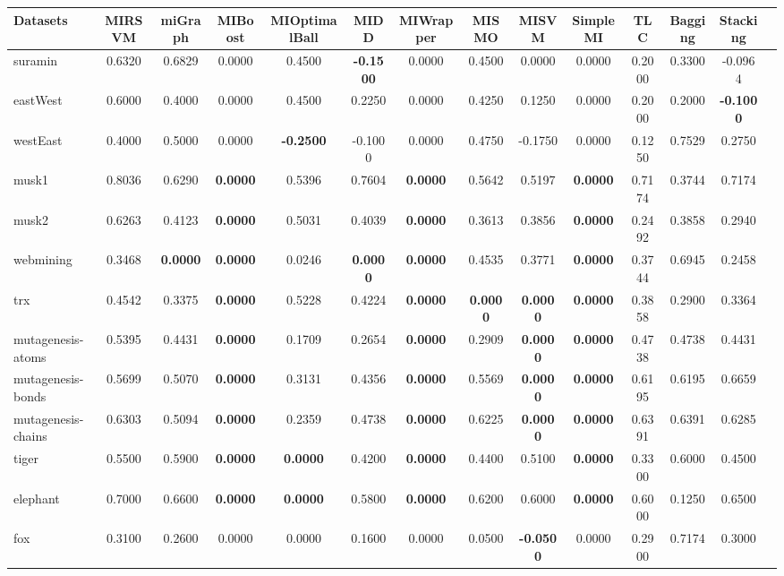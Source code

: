\begin{threeparttable}
\begin{tabular}{lccccccccccccc}
\toprule
Datasets &MIRSVM &miGraph &MIBoost &MIOptimalBall &MIDD &MIWrapper &MISMO &MISVM &SimpleMI &TLC &Bagging &Stacking \\
\midrule
suramin &0.6320 &0.6829 &0.0000 &0.4500 &\textbf{-0.1500} &0.0000 &0.4500 &0.0000 &0.0000 &0.2000 &0.3300 &-0.0964 &  \\
eastWest &0.6000 &0.4000 &0.0000 &0.4500 &0.2250 &0.0000 &0.4250 &0.1250 &0.0000 &0.2000 &0.2000 &\textbf{-0.1000} &  \\
westEast &0.4000 &0.5000 &0.0000 &\textbf{-0.2500} &-0.1000 &0.0000 &0.4750 &-0.1750 &0.0000 &0.1250 &0.7529 &0.2750 &  \\
musk1 &0.8036 &0.6290 &\textbf{0.0000} &0.5396 &0.7604 &\textbf{0.0000} &0.5642 &0.5197 &\textbf{0.0000} &0.7174 &0.3744 &0.7174 &  \\
musk2 &0.6263 &0.4123 &\textbf{0.0000} &0.5031 &0.4039 &\textbf{0.0000} &0.3613 &0.3856 &\textbf{0.0000} &0.2492 &0.3858 &0.2940 &  \\
webmining &0.3468 &\textbf{0.0000} &\textbf{0.0000} &0.0246 &\textbf{0.0000} &\textbf{0.0000} &0.4535 &0.3771 &\textbf{0.0000} &0.3744 &0.6945 &0.2458 &  \\
trx &0.4542 &0.3375 &\textbf{0.0000} &0.5228 &0.4224 &\textbf{0.0000} &\textbf{0.0000} &\textbf{0.0000} &\textbf{0.0000} &0.3858 &0.2900 &0.3364 &  \\
mutagenesis-atoms &0.5395 &0.4431 &\textbf{0.0000} &0.1709 &0.2654 &\textbf{0.0000} &0.2909 &\textbf{0.0000} &\textbf{0.0000} &0.4738 &0.4738 &0.4431 &  \\
mutagenesis-bonds &0.5699 &0.5070 &\textbf{0.0000} &0.3131 &0.4356 &\textbf{0.0000} &0.5569 &\textbf{0.0000} &\textbf{0.0000} &0.6195 &0.6195 &0.6659 &  \\
mutagenesis-chains &0.6303 &0.5094 &\textbf{0.0000} &0.2359 &0.4738 &\textbf{0.0000} &0.6225 &\textbf{0.0000} &\textbf{0.0000} &0.6391 &0.6391 &0.6285 &  \\
tiger &0.5500 &0.5900 &\textbf{0.0000} &\textbf{0.0000} &0.4200 &\textbf{0.0000} &0.4400 &0.5100 &\textbf{0.0000} &0.3300 &0.6000 &0.4500 &  \\
elephant &0.7000 &0.6600 &\textbf{0.0000} &\textbf{0.0000} &0.5800 &\textbf{0.0000} &0.6200 &0.6000 &\textbf{0.0000} &0.6000 &0.1250 &0.6500 &  \\
fox &0.3100 &0.2600 &0.0000 &0.0000 &0.1600 &0.0000 &0.0500 &\textbf{-0.0500} &0.0000 &0.2900 &0.7174 &0.3000 &  \\

\end{tabular}
\end{threeparttable}
